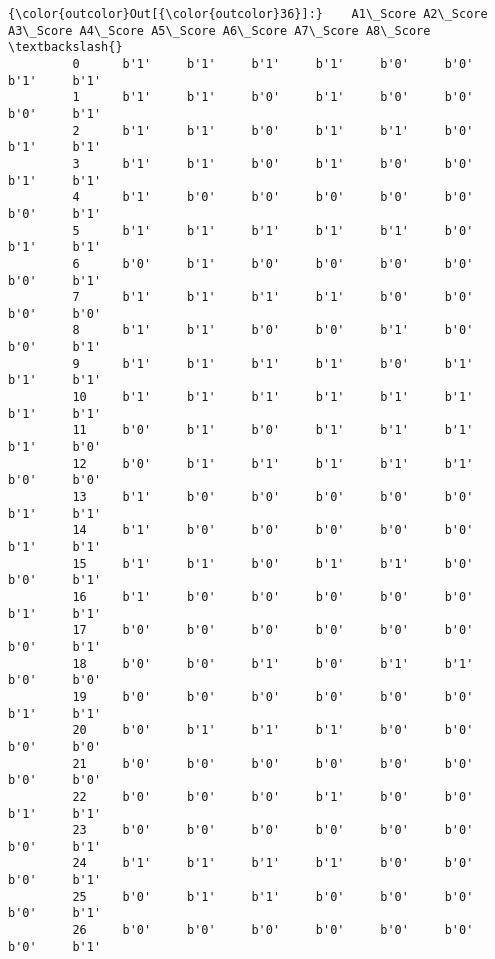 \documentclass[11pt]{article}
\begin{document}
\begin{Verbatim}[commandchars=\\\{\}]
{\color{outcolor}Out[{\color{outcolor}36}]:}    A1\_Score A2\_Score A3\_Score A4\_Score A5\_Score A6\_Score A7\_Score A8\_Score  \textbackslash{}
         0      b'1'     b'1'     b'1'     b'1'     b'0'     b'0'     b'1'     b'1'   
         1      b'1'     b'1'     b'0'     b'1'     b'0'     b'0'     b'0'     b'1'   
         2      b'1'     b'1'     b'0'     b'1'     b'1'     b'0'     b'1'     b'1'   
         3      b'1'     b'1'     b'0'     b'1'     b'0'     b'0'     b'1'     b'1'   
         4      b'1'     b'0'     b'0'     b'0'     b'0'     b'0'     b'0'     b'1'   
         5      b'1'     b'1'     b'1'     b'1'     b'1'     b'0'     b'1'     b'1'   
         6      b'0'     b'1'     b'0'     b'0'     b'0'     b'0'     b'0'     b'1'   
         7      b'1'     b'1'     b'1'     b'1'     b'0'     b'0'     b'0'     b'0'   
         8      b'1'     b'1'     b'0'     b'0'     b'1'     b'0'     b'0'     b'1'   
         9      b'1'     b'1'     b'1'     b'1'     b'0'     b'1'     b'1'     b'1'   
         10     b'1'     b'1'     b'1'     b'1'     b'1'     b'1'     b'1'     b'1'   
         11     b'0'     b'1'     b'0'     b'1'     b'1'     b'1'     b'1'     b'0'   
         12     b'0'     b'1'     b'1'     b'1'     b'1'     b'1'     b'0'     b'0'   
         13     b'1'     b'0'     b'0'     b'0'     b'0'     b'0'     b'1'     b'1'   
         14     b'1'     b'0'     b'0'     b'0'     b'0'     b'0'     b'1'     b'1'   
         15     b'1'     b'1'     b'0'     b'1'     b'1'     b'0'     b'0'     b'1'   
         16     b'1'     b'0'     b'0'     b'0'     b'0'     b'0'     b'1'     b'1'   
         17     b'0'     b'0'     b'0'     b'0'     b'0'     b'0'     b'0'     b'1'   
         18     b'0'     b'0'     b'1'     b'0'     b'1'     b'1'     b'0'     b'0'   
         19     b'0'     b'0'     b'0'     b'0'     b'0'     b'0'     b'1'     b'1'   
         20     b'0'     b'1'     b'1'     b'1'     b'0'     b'0'     b'0'     b'0'   
         21     b'0'     b'0'     b'0'     b'0'     b'0'     b'0'     b'0'     b'0'   
         22     b'0'     b'0'     b'0'     b'1'     b'0'     b'0'     b'1'     b'1'   
         23     b'0'     b'0'     b'0'     b'0'     b'0'     b'0'     b'0'     b'1'   
         24     b'1'     b'1'     b'1'     b'1'     b'0'     b'0'     b'0'     b'1'   
         25     b'0'     b'1'     b'1'     b'0'     b'0'     b'0'     b'0'     b'1'   
         26     b'0'     b'0'     b'0'     b'0'     b'0'     b'0'     b'0'     b'1'   

\end{Verbatim}
\end{document}
